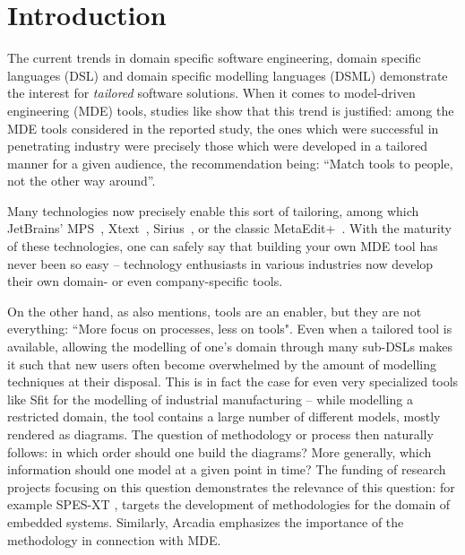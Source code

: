 \section{Introduction}
\label{sec:intro}
\vspace{-.3cm}
The current trends in domain specific software engineering, domain specific
languages (DSL) and domain specific modelling languages (DSML) demonstrate the
interest for \emph{tailored} software solutions.
When it comes to model-driven engineering (MDE) tools, studies like \cite{DBLP:conf/models/WhittleHRBH13} 
show that this trend is justified: among the MDE tools considered
in the reported study, the ones which were successful in penetrating industry
were precisely those which were developed in a tailored manner for a given
audience, the recommendation being: ``Match tools to people, not the other way
around''.

Many technologies now precisely enable this sort of tailoring, among which 
JetBrains' MPS~\cite{DBLP:conf/pppj/PechSV13},
Xtext~\cite{DBLP:conf/oopsla/EysholdtB10},
Sirius~\cite{DBLP:conf/asplos/HauswaldLZLRKDM15}, or the classic MetaEdit+~\cite{DBLP:conf/sle/Tolvanen16}.
With the maturity of these technologies, one can safely say that building your own MDE tool
has never been so easy -- technology enthusiasts in various industries now
develop their own domain- or even company-specific tools.

On the other hand, as \cite{DBLP:conf/models/WhittleHRBH13} also mentions, tools
are an enabler, but they are not everything: ``More focus on processes, less on
tools".
Even when a tailored tool is available, allowing the modelling of one's domain
through many sub-DSLs makes it such that new users often become overwhelmed by
the amount of modelling techniques at their disposal. This is in fact the case
for even very specialized tools like Sfit \cite{DBLP:conf/vamos/BayhaLAMI16} for
the modelling of industrial manufacturing -- while modelling a restricted
domain, the tool contains a large number of different models, mostly rendered as
diagrams. The question of methodology or process then naturally follows: in
which order should one build the diagrams? More generally, which information
should one model at a given point in time? The funding of research projects
focusing on this question demonstrates the relevance of this question: for
example SPES-XT \cite{DBLP:books/sp/spes2016}, targets the development of
methodologies for the domain of embedded systems.
Similarly, Arcadia \cite{DBLP:conf/syscon/BonnetVEN16} emphasizes the importance
of the methodology in connection with MDE.


